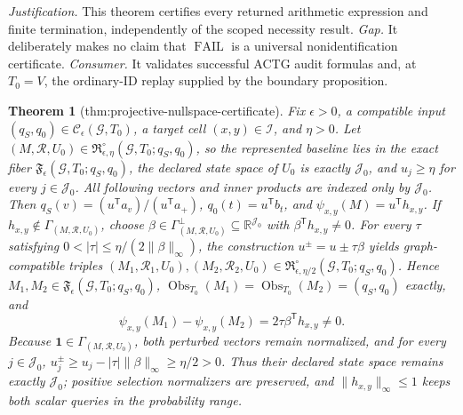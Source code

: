 \documentclass{article}
\newtheorem{theorem}{Theorem}
\begin{document}
\par\smallskip\noindent \textit{Justification.} This theorem certifies every returned arithmetic expression and finite termination, independently of the scoped necessity result. \textit{Gap.} It deliberately makes no claim that \(\operatorname{FAIL}\) is a universal nonidentification certificate. \textit{Consumer.} It validates successful ACTG audit formulas and, at \(T_0=V\), the ordinary-ID replay supplied by the boundary proposition.

\begin{theorem}[thm:projective-nullspace-certificate]\label{thm:projective-nullspace-certificate}
Fix \(\epsilon>0\), a compatible input \((q_S,q_0)\in\mathcal C_{\epsilon}(\mathcal G,T_0)\), a target cell \((x,y)\in\mathcal I\), and \(\eta>0\). Let \((M,\mathcal R,U_0)\in\mathfrak R_{\epsilon,\eta}^{\circ}(\mathcal G,T_0;q_S,q_0)\), so the represented baseline lies in the exact fiber \(\mathfrak F_{\epsilon}(\mathcal G,T_0;q_S,q_0)\), the declared state space of \(U_0\) is exactly \(\mathcal J_0\), and \(u_j\ge\eta\) for every \(j\in\mathcal J_0\). All following vectors and inner products are indexed only by \(\mathcal J_0\). Then \(q_S(v)=(u^{\mathsf T}a_v)/(u^{\mathsf T}a_+)\), \(q_0(t)=u^{\mathsf T}b_t\), and \(\psi_{x,y}(M)=u^{\mathsf T}h_{x,y}\). If \(h_{x,y}\notin\Gamma_{(M,\mathcal R,U_0)}\), choose \(\beta\in\Gamma_{(M,\mathcal R,U_0)}^{\perp}\subseteq\mathbb R^{\mathcal J_0}\) with \(\beta^{\mathsf T}h_{x,y}\ne0\). For every \(\tau\) satisfying \(0<\lvert\tau\rvert\le\eta/(2\lVert\beta\rVert_{\infty})\), the construction \(u^{\pm}=u\pm\tau\beta\) yields graph-compatible triples \((M_1,\mathcal R_1,U_0),(M_2,\mathcal R_2,U_0)\in\mathfrak R_{\epsilon,\eta/2}^{\circ}(\mathcal G,T_0;q_S,q_0)\). Hence \(M_1,M_2\in\mathfrak F_{\epsilon}(\mathcal G,T_0;q_S,q_0)\), \(\operatorname{Obs}_{T_0}(M_1)=\operatorname{Obs}_{T_0}(M_2)=(q_S,q_0)\) exactly, and \[\psi_{x,y}(M_1)-\psi_{x,y}(M_2)=2\tau\beta^{\mathsf T}h_{x,y}\ne0.\] Because \(\mathbf 1\in\Gamma_{(M,\mathcal R,U_0)}\), both perturbed vectors remain normalized, and for every \(j\in\mathcal J_0\), \(u_j^{\pm}\ge u_j-\lvert\tau\rvert\lVert\beta\rVert_{\infty}\ge\eta/2>0\). Thus their declared state space remains exactly \(\mathcal J_0\); positive selection normalizers are preserved, and \(\lVert h_{x,y}\rVert_{\infty}\le1\) keeps both scalar queries in the probability range.
\end{theorem}
\end{document}
